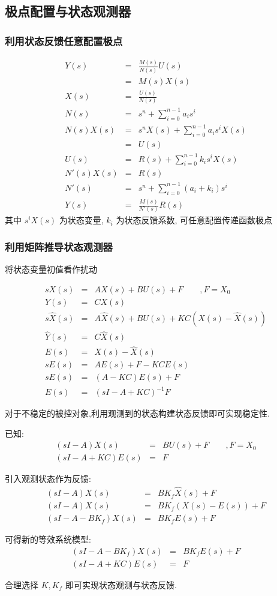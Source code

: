 \documentclass{article}
\begin{document}
\subsection{极点配置与状态观测器}
\label{sec-3-2}
\begin{frame}
\frametitle{利用状态反馈任意配置极点}
\label{sec-3-2-1}

\begin{eqnarray*}
Y(s) & =& \frac{M(s)}{N(s)}U(s)\\
     &=& M(s)X(s) \\
X(s) &=& \frac{U(s)}{N(s)}\\
N(s) &=& s^n+\sum_{i=0}^{n-1} a_i s^i \\
N(s)X(s) &=& s^n X(s)+\sum_{i=0}^{n-1} a_i s^i X(s)  \\
         &=& U(s) \\
U(s) &=& R(s)+\sum_{i=0}^{n-1}k_i s^i X(s) \\
N'(s)X(s) &=& R(s) \\
N'(s) &=& s^n +\sum_{i=0}^{n-1}(a_i+k_i)s^i  \\
Y(s) &=& \frac{M(s)}{N'(s)}R(s)
\end{eqnarray*}
其中 $s^i X(s)$ 为状态变量, $k_i$ 为状态反馈系数, 可任意配置传递函数极点
\end{frame}
\begin{frame}
\frametitle{利用矩阵推导状态观测器}
\label{sec-3-2-2}

将状态变量初值看作扰动

\begin{eqnarray*}
sX(s) &= & AX(s)+BU(s)+F \qquad , F=X_0\\
Y(s) &=& CX(s)\\
s\hat{X}(s) &=& A\hat{X}(s)+BU(s)+KC(X(s)-\hat{X}(s))\\
\hat{Y}(s) &=& C\hat{X}(s)\\
E(s) &=& X(s)-\hat{X}(s) \\
sE(s) &=& AE(s)+F-KCE(s)\\
sE(s) &=& (A-KC)E(s)+F\\
E(s) &=& (sI-A+KC)^{-1}F
\end{eqnarray*}


对于不稳定的被控对象,利用观测到的状态构建状态反馈即可实现稳定性.

已知:
\begin{eqnarray*}
(sI-A)X(s) &= & BU(s)+F \qquad , F=X_0\\
(sI-A+KC)E(s) &=& F
\end{eqnarray*}

引入观测状态作为反馈:
\begin{eqnarray*}
(sI-A)X(s) & =& BK_f\hat{X}(s)+F \\
(sI-A)X(s) & =& BK_f(X(s)-E(s))+F \\
(sI-A-BK_f)X(s) & =& BK_fE(s)+F 
\end{eqnarray*}

可得新的等效系统模型:
\begin{eqnarray*}
(sI-A-BK_f)X(s) & =& BK_fE(s)+F \\
(sI-A+KC)E(s) &=& F
\end{eqnarray*}

合理选择 $K,K_f$ 即可实现状态观测与状态反馈.
\end{frame}
\end{document}

